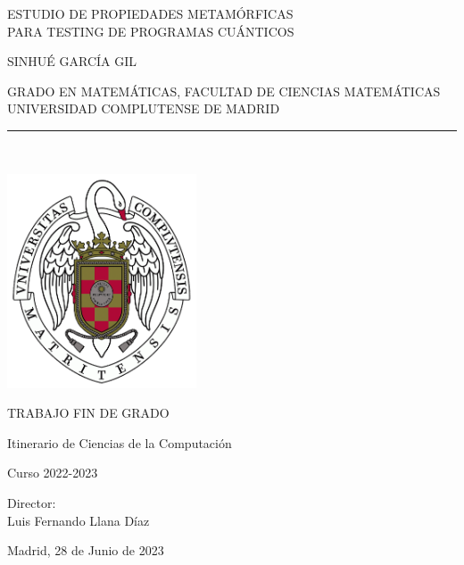 \newpage

\thispagestyle{empty}


\begin{center}

   \vspace{5cm}

   {\Large ESTUDIO DE PROPIEDADES METAMÓRFICAS\\ 
   \vspace{0.35cm}
   PARA TESTING DE PROGRAMAS CUÁNTICOS}\\

   \vspace{0.5cm}

   \vspace{0.5cm}

   {\large SINHUÉ GARCÍA GIL}\\

   \vspace{1cm}


   GRADO EN MATEMÁTICAS, FACULTAD DE CIENCIAS MATEMÁTICAS\\
   \vspace{0.2cm}
   UNIVERSIDAD COMPLUTENSE DE MADRID \\


   \vspace{0.65cm}
   \rule{2in}{0.5pt}\\
   \vspace{0.85cm}
   
   \includegraphics[height=2.5in]{imagenes/escudo.png}
  

   \vspace{0.5cm}
TRABAJO FIN DE GRADO\\ 
    \vspace{0.3cm}
        
Itinerario de Ciencias de la Computación

   \vspace{0.5cm}


  Curso 2022-2023
   \vspace{1cm}

\end{center}

{\raggedleft
Director:\\
   \vspace{0.3cm}
Luis Fernando Llana Díaz\\
    \vspace{1.5cm}

Madrid, 28 de Junio de 2023\\
}